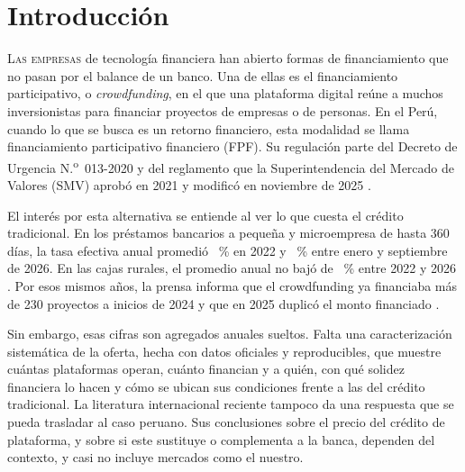 \section{Introducción}

\noindent\lettrine{L}{as empresas} de tecnología financiera han abierto formas de financiamiento que no pasan por el balance de un banco. Una de ellas es el financiamiento participativo, o \textit{crowdfunding}, en el que una plataforma digital reúne a muchos inversionistas para financiar proyectos de empresas o de personas. En el Perú, cuando lo que se busca es un retorno financiero, esta modalidad se llama financiamiento participativo financiero (FPF). Su regulación parte del Decreto de Urgencia N.\textsuperscript{o}~013-2020 y del reglamento que la Superintendencia del Mercado de Valores (SMV) aprobó en 2021 y modificó en noviembre de 2025 \parencite{du0132020,smv0452021,smv0192025}.

El interés por esta alternativa se entiende al ver lo que cuesta el crédito tradicional. En los préstamos bancarios a pequeña y microempresa de hasta 360 días, la tasa efectiva anual promedió ~\% en 2022 y ~\% entre enero y septiembre de 2026. En las cajas rurales, el promedio anual no bajó de ~\% entre 2022 y 2026 \parencite{bcrpdata2026}. Por esos mismos años, la prensa informa que el crowdfunding ya financiaba más de 230 proyectos a inicios de 2024 y que en 2025 duplicó el monto financiado \parencite{ramirez2024,ramirez2026}.

Sin embargo, esas cifras son agregados anuales sueltos. Falta una caracterización sistemática de la oferta, hecha con datos oficiales y reproducibles, que muestre cuántas plataformas operan, cuánto financian y a quién, con qué solidez financiera lo hacen y cómo se ubican sus condiciones frente a las del crédito tradicional. La literatura internacional reciente tampoco da una respuesta que se pueda trasladar al caso peruano. Sus conclusiones sobre el precio del crédito de plataforma, y sobre si este sustituye o complementa a la banca, dependen del contexto, y casi no incluye mercados como el nuestro.

